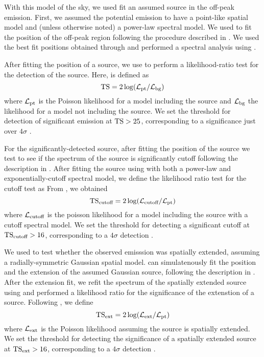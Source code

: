 With this model of the sky, we used fit an assumed source in the off-peak
emission.  First, we assumed the potential emission to have a point-like
spatial model and (unless otherwise noted) a power-law spectral model.
We used \pointlike to fit the position of the off-peak region following
the procedure described in \cite{LAT_Collaboration_2FGL_2012}.  We used
the best fit positions obtained through \pointlike and performed a
spectral analysis using \gtlike.

After fitting the position of a source, we use \gtlike to perform a
likelihood-ratio test for the detection of the source. Here, \ts is
defined as
\begin{equation}
  \text{TS} = 2 \log(\mathcal{L}_\text{pt}/\mathcal{L}_\text{bg})
\end{equation}
where $\mathcal{L}_\text{pt}$ is the Poisson likelihood for a model
including the source and $\mathcal{L}_\text{bg}$ the likelihood for a
model not including the source.  We set the threshold for detection of
significant emission at $\text{TS}>25$, corresponding to a significance just
over $4\sigma$ \citep{LAT_Collaboration_1FGL_2010}.

For the significantly-detected source, after fitting the
position of the source we test to see if the spectrum of the
source is significantly cutoff following the description in
\cite{LAT_collaboration_PWNCAT_2011}. After fitting the source using
\gtlike with both a power-law and exponentially-cutoff spectral model,
we define the likelihood ratio test for the cutoff test as From \gtlike,
we obtained
\begin{equation}
  \text{TS}_\text{cutoff}= 2 \log(\mathcal{L}_\text{cutoff}/\mathcal{L}_\text{pt})
\end{equation}
where $\mathcal{L}_\text{cutoff}$ is the poisson likelihood for a model
including the source with a cutoff spectral model.  We set the threshold
for detecting a significant cutoff at $\text{TS}_\text{cutoff}>16$, corresponding to a
$4\sigma$ detection \citep{LAT_collaboration_PWNCAT_2011} .

We used \pointlike to test whether the observed emisssion was
spatially extended, assuming a radially-symmetric Gaussian spatial
model.  \pointlike can simulatenously fit the position and the
extension of the assumed Gaussian source, following the description in
\citep{LAT_collaboration_extended_search_2012}.  After the extension fit,
we refit the spectrum of the spatially extended source using \gtlike
and performed a likelihood ratio for the significance of the extenstion
of a source.  Following \cite{LAT_collaboration_extended_search_2012},
we define
\begin{equation}
  \text{TS}_\text{ext} = 2 \log(\mathcal{L}_\text{ext}/\mathcal{L}_\text{pt})
\end{equation}
where $\mathcal{L}_\text{ext}$ is the Poisson likelihood assuming the
source is spatially extended. We set the threshold for detecting the
significance of a spatially extended source at $\text{TS}_\text{ext}>16$, corresponding
to a $4\sigma$ detection \citep{LAT_collaboration_extended_search_2012}.

